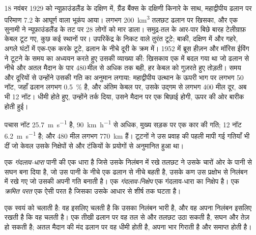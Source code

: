 \begin{history}[1929 में समुद्र-तल पर केबल]
18 नवंबर 1929 को न्यूफ़ाउंडलैंड के दक्षिण में, ग्रैंड बैंक्स के दक्षिणी किनारे के साथ, महाद्वीपीय ढलान पर परिमाण 7.2 के आघूर्ण वाला भूकंप आया। लगभग \qty{200}{km^3} तलछट ढलान पर खिसका, और एक सुनामी ने न्यूफ़ाउंडलैंड के तट पर 28 लोगों को मार डाला। समुद्र-तल के आर-पार बिछे बारह टेलीग्राफ़ केबल टूट गए, कुछ कई स्थानों पर। उपरिकेंद्र के निकट वाले तुरंत टूटे; बाकी, दक्षिण में और गहरे, अगले घंटों में एक-एक करके टूटे, ढलान के नीचे दूरी के क्रम में। 1952 में ब्रूस हीज़न और मॉरिस ईविंग ने टूटने के समय का अध्ययन करते हुए उसकी व्याख्या की: खिसकाव एक  में बदल गया था जो ढलान से नीचे और अतल मैदान के पार 480\,मील से अधिक तक बही, हर केबल को गुज़रते हुए तोड़ती। समय और दूरियों से उन्होंने उसकी गति का अनुमान लगाया: महाद्वीपीय उत्थान के ऊपरी भाग पर लगभग 50 नॉट, जहाँ ढलान लगभग \qty{0.5}{\percent} है, और अंतिम केबल पर, उसके उद्गम से लगभग 400 मील दूर, अब भी 12 नॉट। धीमी होते हुए, उन्होंने तर्क दिया, उसने मैदान पर एक  बिछाई होगी, ऊपर की ओर बारीक होती हुई।
\end{history}

पचास नॉट \qty{25.7}{m.s^{-1}} है, \qty{90}{km.h^{-1}} से अधिक, मुख्य सड़क पर एक कार की गति; 12 नॉट \qty{6.2}{m.s^{-1}} है; और 480 मील लगभग \qty{770}{km} हैं। टूटनों ने उस प्रवाह की पहली मापी गई गतियाँ भी दीं जो केवल उसके निक्षेपों से और टंकियों के प्रयोगों से अनुमानित हुआ था।

\begin{definition}[गंदलाव-धारा, गंदलाव-निक्षेप, क्रमित परत]\label{def:b1:clastic-sediments:turbidite}
एक \emph{गंदलाव-धारा} पानी की एक धारा है जिसे उसके निलंबन में रखे तलछट ने उसके चारों ओर के पानी से सघन बना दिया है, जो उस पानी के नीचे एक ढलान से नीचे बहती है, उसके कण उस प्रक्षोभ से निलंबन में रखे गए जो उसकी अपनी गति बनाती है। एक \emph{गंदलाव-निक्षेप} एक गंदलाव-धारा का निक्षेप है। एक \emph{क्रमित परत} एक ऐसी परत है जिसका  उसके आधार से शीर्ष तक घटता है।
\end{definition}

एक  स्वयं को चलाती है: वह इसलिए चलती है कि उसका निलंबन भारी है, और वह अपना निलंबन इसलिए रखती है कि वह चलती है। एक तीखी ढलान पर वह तल से और तलछट उठा सकती है, सघन और तेज़ हो सकती है; अतल मैदान की मंद ढलान पर वह धीमी होती है, अपना भार गिराती है और समाप्त होती है।


